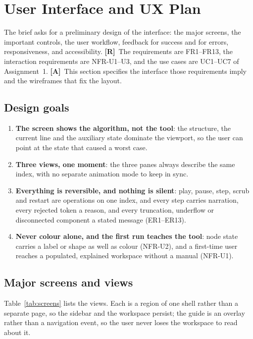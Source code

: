\documentclass[11pt,a4paper]{article}
\newcommand{\R}{\textcolor{reqc}{\textbf{[R]}}}     %
\newcommand{\A}{\textcolor{asmc}{\textbf{[A]}}}     %
\begin{document}
\section{User Interface and UX Plan}

The brief asks for a preliminary design of the interface: the major screens, the important
controls, the user workflow, feedback for success and for errors, responsiveness, and
accessibility. \R\ The requirements are FR1--FR13, the interaction requirements are NFR-U1--U3,
and the use cases are UC1--UC7 of Assignment~1. \A\ This section specifies the interface those
requirements imply and the wireframes that fix the layout.

\subsection{Design goals}

\begin{enumerate}[leftmargin=1.6em,topsep=2pt,itemsep=1pt]
  \item \textbf{The screen shows the algorithm, not the tool}: the structure, the current line
        and the auxiliary state dominate the viewport, so the user can point at the state that
        caused a worst case.
  \item \textbf{Three views, one moment}: the three panes always describe the same index, with
        no separate animation mode to keep in sync.
  \item \textbf{Everything is reversible, and nothing is silent}: play, pause, step, scrub and
        restart are operations on one index, and every step carries narration, every rejected
        token a reason, and every truncation, underflow or disconnected component a stated
        message (ER1--ER13).
  \item \textbf{Never colour alone, and the first run teaches the tool}: node state carries a
        label or shape as well as colour (NFR-U2), and a first-time user reaches a populated,
        explained workspace without a manual (NFR-U1).
\end{enumerate}

\subsection{Major screens and views}

Table~\ref{tab:screens} lists the views. Each is a region of one shell rather than a separate
page, so the sidebar and the workspace persist; the guide is an overlay rather than a
navigation event, so the user never loses the workspace to read about it.
\end{document}
